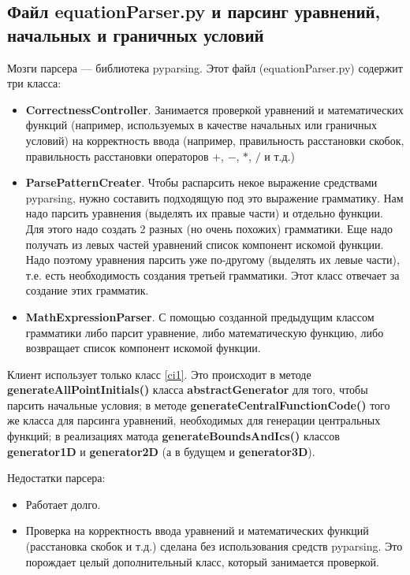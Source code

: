 \documentclass[a4paper]{article}
\begin{document}
\subsection{\Large Файл equationParser.py и парсинг уравнений, начальных и граничных условий}
Мозги парсера --- библиотека pyparsing. Этот файл (equationParser.py) содержит три класса:
\begin{itemize}
\item {\bf CorrectnessController}. Занимается проверкой уравнений и ма\-те\-ма\-ти\-чес\-ких функций (например, используемых в качестве начальных или граничных условий) на корректность ввода (например, пра\-виль\-ность расстановки скобок, правильность расстановки операторов $+$, $-$, $*$, $/$ и т.д.)
\item {\bf ParsePatternCreater}. Чтобы распарсить некое выражение сред\-ства\-ми pyparsing, нужно составить подходящую под это выражение грамматику. Нам надо парсить уравнения (выделять их правые части) и отдельно функции. Для этого надо создать 2 разных (но очень похожих) грамматики. Еще надо получать из левых частей уравнений список компонент искомой функции. Надо поэтому уравнения пар\-сить уже по-другому (выделять их левые части), т.е. есть не\-об\-хо\-ди\-мость создания третьей грамматики. Этот класс отвечает за создание этих грамматик.
\item {\bf MathExpressionParser}. С помощью созданной предыдущим клас\-сом грамматики либо парсит уравнение, либо математическую функ\-цию, либо возвращает список компонент искомой функции. \label{ci1}
\end{itemize}
Клиент использует только класс \ref{ci1}. Это происходит в методе {\bf generateAllPointInitials()} класса {\bf abstractGenerator} для того, чтобы пар\-сить начальные условия; в методе {\bf generateCentralFunctionCode()} того же класса для парсинга уравнений, необходимых для генерации центр\-аль\-ных функций; в реализациях матода {\bf generateBoundsAndIcs()} клас\-сов {\bf generator1D} и {\bf generator2D} (а в будущем и {\bf generator3D}).

Недостатки парсера:
\begin{itemize}
\item Работает долго.
\item Проверка на корректность ввода уравнений и математических функ\-ций (расстановка скобок и т.д.) сделана без использования средств pyparsing. Это порождает целый дополнительный класс, который занимается проверкой.
\end{itemize}
\end{document}
